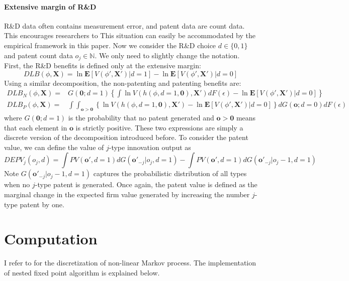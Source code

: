\paragraph{Extensive margin of R\&D} R\&D data often contains measurement error, and patent data are count data. This encourages researchers to  This situation can easily be accommodated by the empirical framework in this paper. Now we consider the R\&D choice $d\in\{0,1\}$ and patent count data $o_j\in\mathbb{N}$. We only need to slightly change the notation. First, the R\&D benefits is defined only at the extensive margin:
\begin{equation}
    DLB(\phi,\mathbf{X}) =\ln\mathbf{E}[V(\phi',\mathbf{X}')|d=1]-\ln\mathbf{E}[V(\phi',\mathbf{X}')|d=0]
\end{equation}
Using a similar decomposition, the non-patenting and patenting benefits are:
\begin{align}
    DLB_N(\phi,\mathbf{X}) =& G(\mathbf{0};d=1)\left\{\int \ln V(h(\phi,d=1,\mathbf{0}),\mathbf{X}')dF(\epsilon)-\ln\mathbf{E}[V(\phi',\mathbf{X}')|d=0]\right\} \label{DLB_N} \\ 
    DLB_P(\phi,\mathbf{X}) =&\int \int_{\mathbf{o}>\mathbf{0}}\left\{\ln V(h(\phi,d=1,\mathbf{0}),\mathbf{X}')-\ln\mathbf{E}[V(\phi',\mathbf{X}')|d=0]\right\}dG(\mathbf{o};d=0)dF(\epsilon) \label{DLB_P}
\end{align}
where $G(\mathbf{0};d=1)$ is the probability that no patent generated and $\mathbf{o}>\mathbf{0}$ means that each element in $\mathbf{o}$ is strictly positive. These two expressions are simply a discrete version of the decomposition introduced before. To consider the patent value, we can define the value of $j$-type innovation output as 
\begin{equation} \label{patent_value}
    DEPV_j(o_j,d) = \int PV(\mathbf{o}',d=1)dG(\mathbf{o}'_{-j}|o_j,d=1)-\int PV(\mathbf{o}',d=1)dG(\mathbf{o}'_{-j}|o_j-1,d=1)
\end{equation}
Note $G(\mathbf{o}'_{-j}|o_j-1,d=1)$ captures the probabilistic distribution of all types when no $j$-type patent is generated. Once again, the patent value is defined as the marginal change in the expected firm value generated by increasing the number $j$-type patent by one. 






\section{Computation}
I refer to \citet{farmer2017} for the discretization of non-linear Markov process. The implementation of nested fixed point algorithm is explained below.

